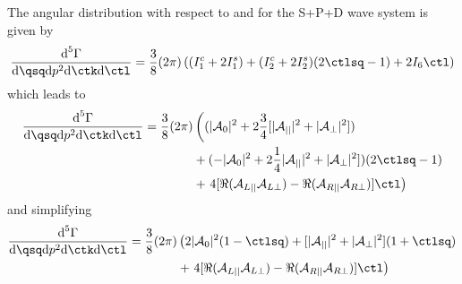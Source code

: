 The angular distribution with respect to \ctl and \ctk for the S+P+D wave system is given by
\begin{equation}
\frac{\text{d}^5\Gamma}{ \text{d}\qsq \text{d}p^2 \text{d}\ctk \text{d}\ctl} = \frac{3}{8} (2\pi) \left( (I_1^c + 2 I_1^s ) + ( I_2^c + 2 I_2^s ) (2\ctlsq-1) + 2 I_6 \ctl \right)
\end{equation}
which leads to 
\begin{align}
\frac{\text{d}^5\Gamma}{ \text{d}\qsq \text{d}p^2 \text{d}\ctk \text{d}\ctl} = \frac{3}{8} (2\pi) & \left( (|\mathcal{A}_{0}|^2 + 2 \frac{3}{4} [ |\mathcal{A}_{||}|^2 + |\mathcal{A}_{\bot}|^2 ] ) \right. \nonumber \\
 & + ( - |\mathcal{A}_{0}|^2 + 2 \frac{1}{4}  |\mathcal{A}_{||}|^2 + |\mathcal{A}_{\bot}|^2 ] ) (2\ctlsq-1) \nonumber \\
 & + \left. 4 [ \Re( \mathcal{A}_{L||}\mathcal{A}_{L\bot}) -\Re( \mathcal{A}_{R||}\mathcal{A}_{R\bot}) ] \ctl  \right)
\end{align}
and simplifying
\begin{align}
\frac{\text{d}^5\Gamma}{ \text{d}\qsq \text{d}p^2 \text{d}\ctk \text{d}\ctl} = \frac{3}{8} (2\pi) & \left(  2 |\mathcal{A}_{0}|^2 ( 1 - \ctlsq )  +[  |\mathcal{A}_{||}|^2 + |\mathcal{A}_{\bot}|^2 ] ( 1 + \ctlsq )   \right. \nonumber \\
 & + \left. 4 [ \Re( \mathcal{A}_{L||}\mathcal{A}_{L\bot}) -\Re( \mathcal{A}_{R||}\mathcal{A}_{R\bot}) ] \ctl  \right)
\end{align}

